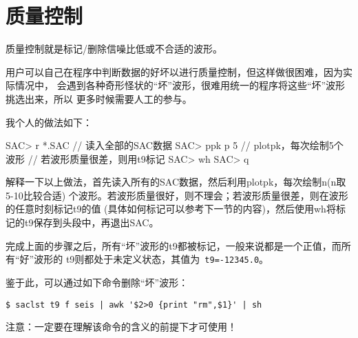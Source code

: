 \section{质量控制}

质量控制就是标记/删除信噪比低或不合适的波形。

用户可以自己在程序中判断数据的好坏以进行质量控制，但这样做很困难，因为实际情况中，
会遇到各种奇形怪状的``坏''波形，很难用统一的程序将这些``坏''波形挑选出来，所以
更多时候需要人工的参与。


我个人的做法如下：
\begin{SACCode}
SAC> r *.SAC        // 读入全部的SAC数据
SAC> ppk p 5        // plotpk，每次绘制5个波形
// 若波形质量很差，则用t9标记
SAC> wh
SAC> q
\end{SACCode}

解释一下以上做法，首先读入所有的SAC数据，然后利用plotpk，每次绘制n(n取5-10比较合适)
个波形。若波形质量很好，则不理会；若波形质量很差，则在波形的任意时刻标记t9的值
(具体如何标记可以参考下一节的内容)，然后使用wh将标记的t9保存到头段中，再退出SAC。

完成上面的步骤之后，所有``坏''波形的t9都被标记，一般来说都是一个正值，而所有``好''波形的
t9则都处于未定义状态，其值为~\verb+t9=-12345.0+。

鉴于此，可以通过如下命令删除``坏''波形：
\begin{verbatim}
$ saclst t9 f seis | awk '$2>0 {print "rm",$1}' | sh
\end{verbatim}

注意：一定要在理解该命令的含义的前提下才可使用！
